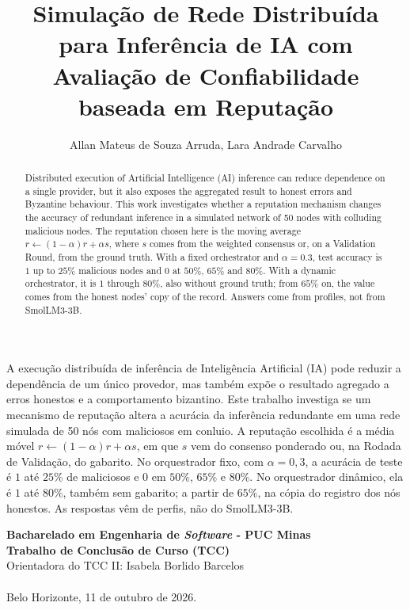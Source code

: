 \documentclass[12pt]{article}
\title{Simulação de Rede Distribuída para Inferência de IA com Avaliação de Confiabilidade baseada em Reputação}
\author{Allan Mateus de Souza Arruda\inst{1}, Lara Andrade Carvalho\inst{1}}
\begin{document}
\maketitle

\begin{abstract}
  Distributed execution of Artificial Intelligence (AI) inference can reduce dependence on a single provider, but it also exposes the aggregated result to honest errors and Byzantine behaviour. This work investigates whether a reputation mechanism changes the accuracy of redundant inference in a simulated network of 50 nodes with colluding malicious nodes. The reputation chosen here is the moving average $r \leftarrow (1-\alpha)r + \alpha s$, where $s$ comes from the weighted consensus or, on a Validation Round, from the ground truth. With a fixed orchestrator and $\alpha = 0.3$, test accuracy is $1$ up to $25\%$ malicious nodes and $0$ at $50\%$, $65\%$ and $80\%$. With a dynamic orchestrator, it is $1$ through $80\%$, also without ground truth; from $65\%$ on, the value comes from the honest nodes' copy of the record. Answers come from profiles, not from SmolLM3-3B.
\end{abstract}

\begin{resumo}
  A execução distribuída de inferência de Inteligência Artificial (IA) pode reduzir a dependência de um único provedor, mas também expõe o resultado agregado a erros honestos e a comportamento bizantino. Este trabalho investiga se um mecanismo de reputação altera a acurácia da inferência redundante em uma rede simulada de 50 nós com maliciosos em conluio. A reputação escolhida é a média móvel $r \leftarrow (1-\alpha)r + \alpha s$, em que $s$ vem do consenso ponderado ou, na Rodada de Validação, do gabarito. No orquestrador fixo, com $\alpha = 0{,}3$, a acurácia de teste é $1$ até $25\%$ de maliciosos e $0$ em $50\%$, $65\%$ e $80\%$. No orquestrador dinâmico, ela é $1$ até $80\%$, também sem gabarito; a partir de $65\%$, na cópia do registro dos nós honestos. As respostas vêm de perfis, não do SmolLM3-3B.
\end{resumo}

\begin{tcolorbox}
\footnotesize
\textbf{Bacharelado em Engenharia de \emph{Software} - PUC Minas\\
Trabalho de Conclusão de Curso (TCC)} \\

\indent Orientadora do TCC II: Isabela Borlido Barcelos \\ \\
Belo Horizonte, 11 de outubro de 2026.
\end{tcolorbox}
\end{document}
